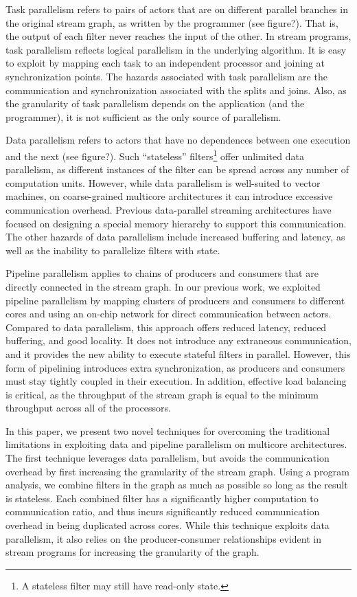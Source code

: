 Task parallelism refers to pairs of actors that are on different
parallel branches in the original stream graph, as written by the
programmer (see figure?).  That is, the output of each filter never
reaches the input of the other.  In stream programs, task parallelism
reflects logical parallelism in the underlying algorithm.  It is easy
to exploit by mapping each task to an independent processor and
joining at synchronization points.  The hazards associated with task
parallelism are the communication and synchronization associated with
the splits and joins.  Also, as the granularity of task parallelism
depends on the application (and the programmer), it is not sufficient
as the only source of parallelism.

Data parallelism refers to actors that have no dependences between one
execution and the next (see figure?).  Such ``stateless''
filters\footnote{A stateless filter may still have read-only state.}
offer unlimited data parallelism, as different instances of the filter
can be spread across any number of computation units.  However, while
data parallelism is well-suited to vector machines, on coarse-grained
multicore architectures it can introduce excessive communication
overhead.  Previous data-parallel streaming architectures have focused
on designing a special memory hierarchy to support this
communication\cite{imagine}.  The other hazards of data parallelism
include increased buffering and latency, as well as the inability to
parallelize filters with state.

Pipeline parallelism applies to chains of producers and consumers that
are directly connected in the stream graph.  In our previous work, we
exploited pipeline parallelism by mapping clusters of producers and
consumers to different cores and using an on-chip network for direct
communication between actors\cite{gordon02asplos}.  Compared to data
parallelism, this approach offers reduced latency, reduced buffering,
and good locality.  It does not introduce any extraneous
communication, and it provides the new ability to execute stateful
filters in parallel.  However, this form of pipelining introduces
extra synchronization, as producers and consumers must stay tightly
coupled in their execution.  In addition, effective load balancing is
critical, as the throughput of the stream graph is equal to the
minimum throughput across all of the processors.

In this paper, we present two novel techniques for overcoming the
traditional limitations in exploiting data and pipeline parallelism on
multicore architectures.  The first technique leverages data
parallelism, but avoids the communication overhead by first increasing
the granularity of the stream graph.  Using a program analysis, we
combine filters in the graph as much as possible so long as the result
is stateless.  Each combined filter has a significantly higher
computation to communication ratio, and thus incurs significantly
reduced communication overhead in being duplicated across cores.
While this technique exploits data parallelism, it also relies on the
producer-consumer relationships evident in stream programs for
increasing the granularity of the graph.

